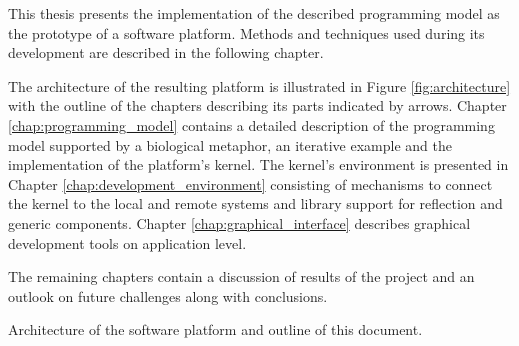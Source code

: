 This thesis presents the implementation of the described programming model as the prototype of a software platform. Methods and techniques used during its development are described in the following chapter. 

The architecture of the resulting platform is illustrated in Figure \ref{fig:architecture} with the outline of the chapters describing its parts indicated by arrows. Chapter \ref{chap:programming_model} contains a detailed description of the programming model supported by a biological metaphor, an iterative example and the implementation of the platform's kernel. The kernel's environment is presented in Chapter \ref{chap:development_environment} consisting of mechanisms to connect the kernel to the local and remote systems and library support for reflection and generic components. Chapter \ref{chap:graphical_interface} describes graphical development tools on application level. 

The remaining chapters contain a discussion of results of the project and an outlook on future challenges along with conclusions.

{Architecture of the software platform and outline of this document.}
